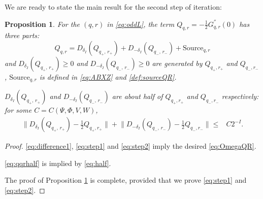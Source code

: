 \documentclass{article}
\numberwithin{equation}{section}
\newtheorem{proposition}[theorem]{Proposition}
\begin{document}
We are ready to state the main result for the second step of iteration:

\begin{proposition}\label{prop:Iteration} 
For the $(q,r)$ in \eqref{eq:oddL}, the term $Q_{q,r}=-\frac{1}{2}G^{''}_{q,r}(0)$ has three parts:  
  \begin{equation}\label{eq:OmegaQR}
  Q_{q,r}=D_{\delta_{I} }(Q_{q_+, \, r_+})+D_{-\delta_{I} }(Q_{q_-, \, r_-})+\text{Source}_{q,r}
  \end{equation} and 
  $D_{\delta_{I} }(Q_{q_+, \, r_+})\geq 0$ and $D_{-\delta_{I}}(Q_{q_-, \, r_-})\geq 0$ are generated by $Q_{q_{+},r_{+}}$ and $Q_{q_{-},r_{-}}$, $\text{Source}_{q,r}$ is defined in \eqref{eq:ABXZ} and \eqref{def:sourceQR}.


  $D_{\delta_{I} }(Q_{q_+, \, r_+})$ and $D_{-\delta_{I}}(Q_{q_-, \, r_-})$ are about half of $Q_{q_{+},r_{+}}$ and $Q_{q_{-},r_{-}}$ respectively: for some $C=C(\Psi,\Phi, V, W)$,
  \begin{align}\label{eq:qqrhalf}
    \big\|D_{\delta_{I} }(Q_{q_+, \, r_+})-\frac{1}{2}Q_{q_{+},r_{+}}\big\|+\big\|D_{-\delta_{I}}(Q_{q_-, \, r_-})-\frac{1}{2}Q_{q_{-},r_{-}}\big\|\leq & C 2^{-I}.
  \end{align}
\end{proposition}
\begin{proof}
  






\eqref{eq:difference1}, \eqref{eq:step1} and \eqref{eq:step2} imply the desired \eqref{eq:OmegaQR}.

\eqref{eq:qqrhalf} is implied by \eqref{eq:half}.

The proof of Proposition \ref{prop:Iteration} is complete, provided that we prove \eqref{eq:step1} and \eqref{eq:step2}.
\end{proof}
\end{document}
